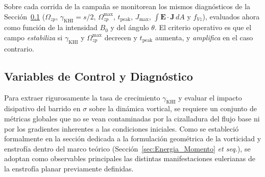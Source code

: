 \primerparrafo Sobre cada corrida de la campaña se monitorean los mismos diagnósticos de la Sección~\ref{subsec:diagnostico} ($\Omega_{zp}$, $\gamma_{\mathrm{KHI}}=s/2$, $\Omega^{\max}_{zp}$, $t_{\mathrm{peak}}$, $J_{\max}$, $\int\mathbf{E}\!\cdot\!\mathbf{J}\,dA$ y $f_{Vz}$), evaluados ahora como función de la intensidad $B_0$ y del ángulo $\theta$. El criterio operativo es que el campo \emph{estabiliza} si $\gamma_{\mathrm{KHI}}$ y $\Omega^{\max}_{zp}$ decrecen y $t_{\mathrm{peak}}$ aumenta, y \emph{amplifica} en el caso contrario.

\subsection{Variables de Control y Diagnóstico}
\label{subsec:diagnostico}

Para extraer rigurosamente la tasa de crecimiento $\gamma_{\text{KHI}}$ y evaluar el impacto disipativo del barrido en $\sigma$ sobre la dinámica vortical, se requiere un conjunto de métricas globales que no se vean contaminadas por la cizalladura del flujo base ni por los gradientes inherentes a las condiciones iniciales. Como se estableció formalmente en la sección dedicada a la formulación geométrica de la vorticidad y enstrofía dentro del marco teórico (Sección~\ref{sec:Energia_Momento} \emph{et seq.}), se adoptan como observables principales las distintas manifestaciones eulerianas de la enstrofía planar previamente definidas.

